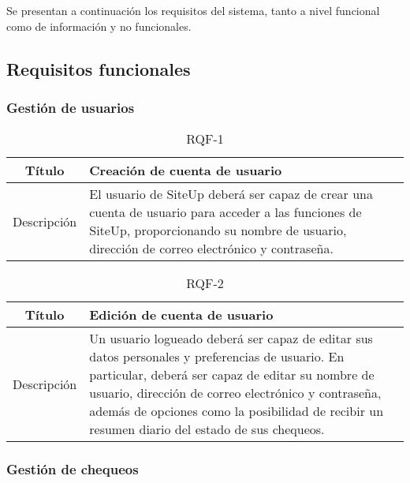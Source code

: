 Se presentan a continuación los requisitos del sistema, tanto a nivel funcional como de información y no funcionales.

\subsection{Requisitos funcionales}

\subsubsection{Gestión de usuarios}

\begin{table}[h!]
  \centering
  \begin{tabularx}{\textwidth}{|c|X|}
    \hline
    Título & Creación de cuenta de usuario \\

    \hline

    Descripción & El usuario de SiteUp deberá ser capaz de crear una cuenta de usuario para acceder a las funciones de SiteUp, proporcionando su nombre de usuario,
                  dirección de correo electrónico y contraseña. \\

    \hline
  \end{tabularx}
  \caption{RQF-1}
\end{table}

\begin{table}[h!]
  \centering
  \begin{tabularx}{\textwidth}{|c|X|}
    \hline
    Título & Edición de cuenta de usuario \\

    \hline

    Descripción & Un usuario logueado deberá ser capaz de editar sus datos personales y preferencias de usuario. En particular, deberá ser capaz de editar su nombre de usuario,
dirección de correo electrónico y contraseña, además de opciones como la posibilidad de recibir un resumen diario del estado de sus chequeos. \\

    \hline
  \end{tabularx}
  \caption{RQF-2}
\end{table}

\FloatBarrier
\subsubsection{Gestión de chequeos}

